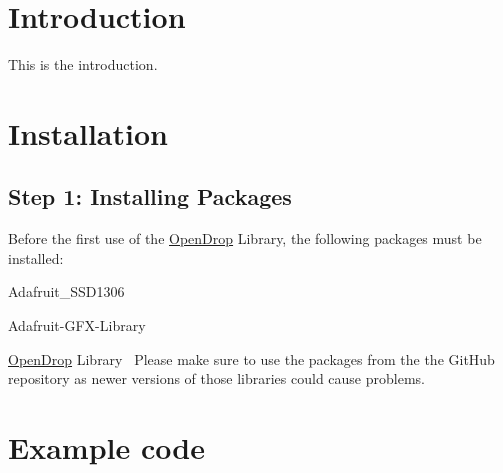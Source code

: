 \hypertarget{index_intro_sec}{}\section{Introduction}\label{index_intro_sec}


This is the introduction.\hypertarget{index_install_sec}{}\section{Installation}\label{index_install_sec}
\hypertarget{index_step1}{}\subsection{Step 1\+: Installing Packages}\label{index_step1}
Before the first use of the \mbox{\hyperlink{class_open_drop}{Open\+Drop}} Library, the following packages must be installed\+:~\newline

\begin{DoxyItemize}
\item Adafruit\+\_\+\+S\+S\+D1306~\newline

\item Adafruit-\/\+G\+F\+X-\/\+Library~\newline

\item \mbox{\hyperlink{class_open_drop}{Open\+Drop}} Library~\newline
 Please make sure to use the packages from the the Git\+Hub repository as newer versions of those libraries could cause problems.
\end{DoxyItemize}\hypertarget{index_example}{}\section{Example code}\label{index_example}


